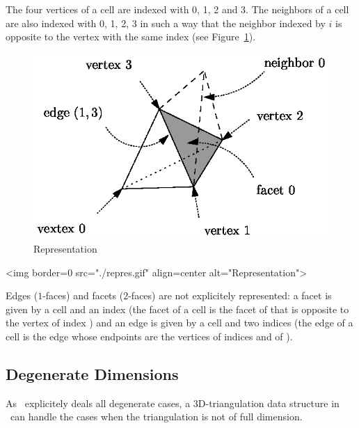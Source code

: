 The four vertices of a cell are indexed with 0, 1, 2 and 3.  The
neighbors of a cell are also indexed with 0, 1, 2, 3 
in such a way that the neighbor indexed by $i$ is opposite to the vertex
with the same index (see Figure~\ref{TDS3-fig-repres}).

\begin{ccTexOnly}
\begin{figure}
\begin{center} 
\includegraphics{repres.eps}
\end{center}
\caption{Representation \label{TDS3-fig-repres}}
\end{figure} 
\end{ccTexOnly}

\begin{ccHtmlOnly}
<img border=0 src="./repres.gif" align=center
alt="Representation">
\end{ccHtmlOnly}

Edges ($1$-faces) and facets ($2$-faces) are not explicitely
represented: a facet is given by a cell and an index (the facet
 of a cell  is the facet of  that is opposite to
the vertex of index ) and an edge is given by a cell and two
indices (the edge  of a cell  is the edge
whose endpoints are the vertices of indices  and  of
). 

\subsection{Degenerate Dimensions}
\label{TDS3-sec-degen_dim}
As \cgal\ explicitely deals all degenerate cases, a 3D-triangulation
data structure in \cgal\ can handle the cases when the triangulation
is not of full dimension.

